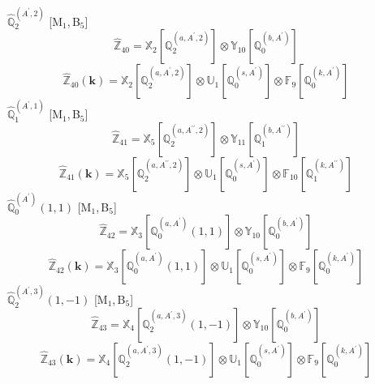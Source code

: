 \documentclass[fleqn,10pt,landscape]{article}
\begin{document}
\begin{itemize}
\begin{dmath*}
\end{dmath*}
\vspace{4mm}
\noindent {} $\,\,\,\hat{\mathbb{Q}}_{2}^{(A^{\prime},2)}$ [M$_{1}$,\,B$_{5}$]
\begin{dmath*}
\hat{\mathbb{Z}}_{40}=\mathbb{X}_{2}[\mathbb{Q}_{2}^{(a,A^{\prime},2)}] \otimes\mathbb{Y}_{10}[\mathbb{Q}_{0}^{(b,A^{\prime})}]
\end{dmath*}
\begin{dmath*}
\hat{\mathbb{Z}}_{40}(\bm{k})=\mathbb{X}_{2}[\mathbb{Q}_{2}^{(a,A^{\prime},2)}] \otimes\mathbb{U}_{1}[\mathbb{Q}_{0}^{(s,A^{\prime})}] \otimes\mathbb{F}_{9}[\mathbb{Q}_{0}^{(k,A^{\prime})}]
\end{dmath*}
\vspace{4mm}
\noindent {} $\,\,\,\hat{\mathbb{Q}}_{1}^{(A^{\prime},1)}$ [M$_{1}$,\,B$_{5}$]
\begin{dmath*}
\hat{\mathbb{Z}}_{41}=\mathbb{X}_{5}[\mathbb{Q}_{2}^{(a,A^{\prime\prime},2)}] \otimes\mathbb{Y}_{11}[\mathbb{Q}_{1}^{(b,A^{\prime\prime})}]
\end{dmath*}
\begin{dmath*}
\hat{\mathbb{Z}}_{41}(\bm{k})=\mathbb{X}_{5}[\mathbb{Q}_{2}^{(a,A^{\prime\prime},2)}] \otimes\mathbb{U}_{1}[\mathbb{Q}_{0}^{(s,A^{\prime})}] \otimes\mathbb{F}_{10}[\mathbb{Q}_{1}^{(k,A^{\prime\prime})}]
\end{dmath*}
\vspace{4mm}
\noindent {} $\,\,\,\hat{\mathbb{Q}}_{0}^{(A^{\prime})}(1,1)$ [M$_{1}$,\,B$_{5}$]
\begin{dmath*}
\hat{\mathbb{Z}}_{42}=\mathbb{X}_{3}[\mathbb{Q}_{0}^{(a,A^{\prime})}(1,1)] \otimes\mathbb{Y}_{10}[\mathbb{Q}_{0}^{(b,A^{\prime})}]
\end{dmath*}
\begin{dmath*}
\hat{\mathbb{Z}}_{42}(\bm{k})=\mathbb{X}_{3}[\mathbb{Q}_{0}^{(a,A^{\prime})}(1,1)] \otimes\mathbb{U}_{1}[\mathbb{Q}_{0}^{(s,A^{\prime})}] \otimes\mathbb{F}_{9}[\mathbb{Q}_{0}^{(k,A^{\prime})}]
\end{dmath*}
\vspace{4mm}
\noindent {} $\,\,\,\hat{\mathbb{Q}}_{2}^{(A^{\prime},3)}(1,-1)$ [M$_{1}$,\,B$_{5}$]
\begin{dmath*}
\hat{\mathbb{Z}}_{43}=\mathbb{X}_{4}[\mathbb{Q}_{2}^{(a,A^{\prime},3)}(1,-1)] \otimes\mathbb{Y}_{10}[\mathbb{Q}_{0}^{(b,A^{\prime})}]
\end{dmath*}
\begin{dmath*}
\hat{\mathbb{Z}}_{43}(\bm{k})=\mathbb{X}_{4}[\mathbb{Q}_{2}^{(a,A^{\prime},3)}(1,-1)] \otimes\mathbb{U}_{1}[\mathbb{Q}_{0}^{(s,A^{\prime})}] \otimes\mathbb{F}_{9}[\mathbb{Q}_{0}^{(k,A^{\prime})}]

\end{dmath*}
\end{itemize}
\end{document}
